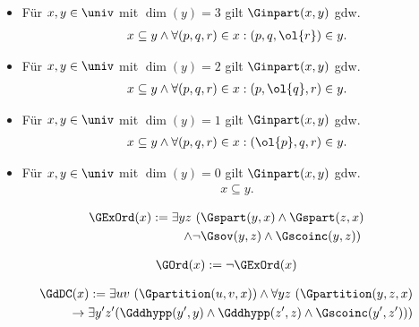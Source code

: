 \begin{hyp}\label{satz:inpart}
    \begin{itemize}\ 
        \item Für $x,y \in \univ$ mit $\dim(y) = 3$ gilt $\Ginpart(x,y)$ gdw.
            \begin{align*}
                x \subseteq y \land \forall (p,q,r) \in x : (p,q,\ol{r}) \in y.
            \end{align*}
        \item Für $x,y \in \univ$ mit $\dim(y) = 2$ gilt $\Ginpart(x,y)$ gdw.
            \begin{align*}
                x \subseteq y \land \forall (p,q,r) \in x : (p,\ol{q},r) \in y.
            \end{align*}
        \item Für $x,y \in \univ$ mit $\dim(y) = 1$ gilt $\Ginpart(x,y)$ gdw.
            \begin{align*}
                x \subseteq y \land \forall (p,q,r) \in x : (\ol{p},q,r) \in y.
            \end{align*}
        \item Für $x,y \in \univ$ mit $\dim(y) = 0$ gilt $\Ginpart(x,y)$ gdw.
            \begin{align*}
                x \subseteq y.
            \end{align*}
    \end{itemize}
\end{hyp}


\begin{erin}
    \begin{align*}
        \GExOrd(x) := \exists yz\ (&\Gspart(y,x) \wedge \Gspart(z,x) \\
        \wedge \neg&\Gsov(y,z) \wedge \Gscoinc(y,z))
    \end{align*}
\end{erin}

\begin{erin}
    \begin{align*}
        \GOrd(x) := \neg\GExOrd(x)
    \end{align*}
\end{erin}

\begin{erin}
    \begin{align*}
        \GdDC(x) := \exists uv\ (\Gpartition(u,v,x)) \wedge \forall yz\ (\Gpartition(y,z,x)\\ 
        \to 
        \exists y'z'(\Gddhypp(y',y) \wedge \Gddhypp(z',z) \wedge \Gscoinc(y',z')))
    \end{align*}
\end{erin}

